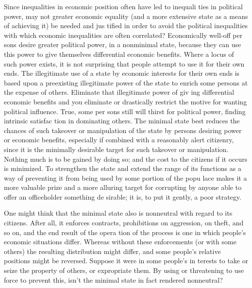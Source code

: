 \documentclass[11pt,openany]{book}
\begin{document}
Since inequalities in economic position often have led to inequali ties in political power, may not greater economic equality (and a more extensive state as a means of achieving it) be needed and jus tified in order to avoid the political inequalities with which economic inequalities are often correlated? Economically well-off per sons desire greater political power, in a nonminimal state, because they can use this power to give themselves differential economic benefits. Where a locus of such power exists, it is not surprising that people attempt to use it for their own ends. The illegitimate use of a state by economic interests for their own ends is based upon a preexisting illegitimate power of the state to enrich some persons at the expense of others. Eliminate that illegitimate power of giv ing differential economic benefits and you eliminate or drastically restrict the motive for wanting political influence. True, some per sons still will thirst for political power, finding intrinsic satisfac tion in dominating others. The minimal state best reduces the chances of such takeover or manipulation of the state by persons desiring power or economic benefits, especially if combined with a reasonably alert citizenry, since it is the minimally desirable target for such takeover or manipulation. Nothing much is to be gained by doing so; and the cost to the citizens if it occurs is minimized. To strengthen the state and extend the range of its functions as a way of preventing it from being used by some portion of the popu lace makes it a more valuable prize and a more alluring target for corrupting by anyone able to offer an officeholder something de sirable; it is, to put it gently, a poor strategy. 

One might think that the minimal state also is nonneutral with regard to its citizens. After all, it enforces contracts, prohibitions on aggression, on theft, and so on, and the end result of the opera tion of the process is one in which people's economic situations differ. Whereas without these enforcements (or with some others) the resulting distribution might differ, and some people's relative positions might be reversed. Suppose it were in some people's in terests to take or seize the property of others, or expropriate them. By using or threatening to use force to prevent this, isn't the minimal state in fact rendered nonneutral? 
\end{document}
